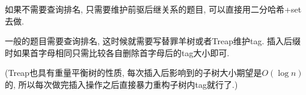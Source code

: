 如果不需要查询排名, 只需要维护前驱后继关系的题目, 可以直接用二分哈希+set去做.

一般的题目需要查询排名, 这时候就需要写替罪羊树或者Treap维护tag. 插入后缀时如果首字母相同只需比较各自删除首字母后的tag大小即可.

(Treap也具有重量平衡树的性质, 每次插入后影响到的子树大小期望是$O(\log n)$的, 所以每次做完插入操作之后直接暴力重构子树内tag就行了.)